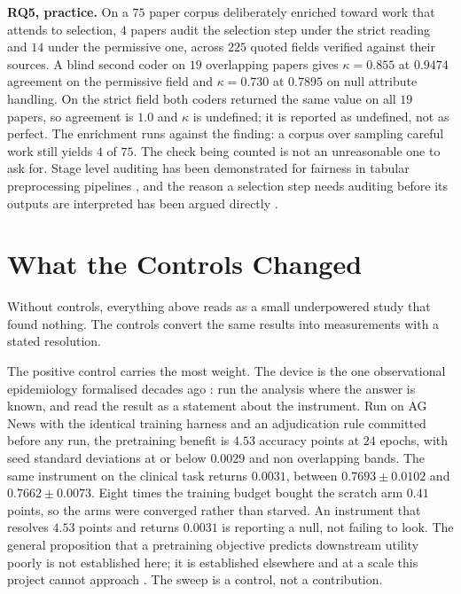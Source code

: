 \textbf{RQ5, practice.} On a $75$ paper corpus deliberately enriched toward work
that attends to selection, $4$ papers audit the selection step under the strict
reading and $14$ under the permissive one, across $225$ quoted fields verified
against their sources. A blind second coder on $19$ overlapping papers gives
$\kappa = 0.855$ at $0.9474$ agreement on the permissive field and
$\kappa = 0.730$ at $0.7895$ on null attribute handling. On the strict field
both coders returned the same value on all $19$ papers, so agreement is $1.0$
and $\kappa$ is undefined; it is reported as undefined, not as perfect. The
enrichment runs against the finding: a corpus over sampling careful work still
yields $4$ of $75$. The check being counted is not an unreasonable one to ask
for. Stage level auditing has been demonstrated for fairness in tabular
preprocessing pipelines \citep{biswas2021fairpreprocessing}, and the reason a
selection step needs auditing before its outputs are interpreted has been argued
directly \citep{pfohl2025disaggregated}.

\section{What the Controls Changed}
\label{sec:conc-controls}

Without controls, everything above reads as a small underpowered study that
found nothing. The controls convert the same results into measurements with a
stated resolution.

The positive control carries the most weight. The device is the one
observational epidemiology formalised decades ago
\citep{lipsitch2010negative}: run the analysis where the answer is known, and
read the result as a statement about the instrument. Run on AG News with the
identical training harness and an adjudication rule committed before any run,
the
pretraining benefit is $4.53$ accuracy points at $24$ epochs, with seed standard
deviations at or below $0.0029$ and non overlapping bands. The same instrument
on the clinical task returns $0.0031$, between $0.7693 \pm 0.0102$ and
$0.7662 \pm 0.0073$. Eight times the training budget bought the scratch arm
$0.41$ points, so the arms were converged rather than starved. An instrument
that resolves $4.53$ points and returns $0.0031$ is reporting a null, not
failing to look. The general proposition that a pretraining objective predicts
downstream utility poorly is not established here; it is established elsewhere
and at a scale this project cannot approach
\citep{lourie2025scaling,feng2026tessera}. The sweep is a control, not a
contribution.

